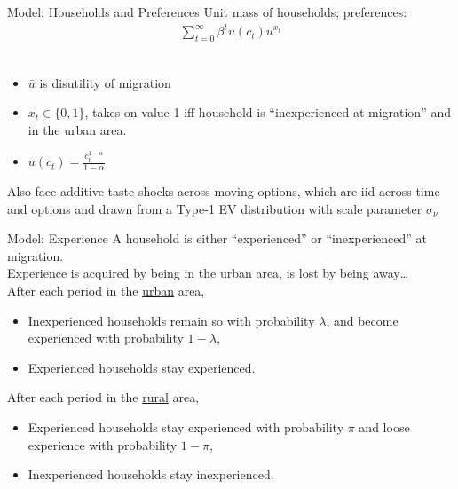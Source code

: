 \documentclass[9pt,pdftex,aspectratio=1610]{beamer}
\theoremstyle{definition}
\begin{document}
\begin{frame}[t]{Model: Households and Preferences}
\medskip
Unit mass of households; preferences:
\begin{align*}
\sum_{t = 0}^{\infty} \beta^t u(c_t) \bar u^{x_t}
\end{align*}\\
\medskip
\begin{itemize}
\item $\bar u$ is disutility of migration
\smallskip
\item $x_t \in \{0,1\}$, takes on value 1 iff household is ``inexperienced at migration'' and in the urban area.
\smallskip
\smallskip
\item $u(c_t) = \frac{c_t^{1-\alpha}}{1-\alpha}$
\end{itemize}
\bigskip
Also face additive taste shocks across moving options, which are iid across time and options and drawn from a Type-1 EV distribution with scale parameter $\sigma_{\nu}$
\end{frame}


\begin{frame}[t]{Model: Experience}
A household is either ``experienced'' or ``inexperienced'' at migration.\\
\medskip
Experience is acquired by being in the urban area, is lost by being away\ldots\\
\bigskip
After each period in the \underline{urban} area,
\begin{itemize}
\item Inexperienced households remain so with probability $\lambda$, and become experienced with probability $1-\lambda$,
\smallskip
\item Experienced households stay experienced.
\end{itemize}
\bigskip
After each period in the \underline{rural} area,
\begin{itemize}
\item Experienced households stay experienced with probability $\pi$ and loose experience with probability $1-\pi$,
\smallskip
\item Inexperienced households stay inexperienced.
\end{itemize}
\end{frame}


\end{document}
